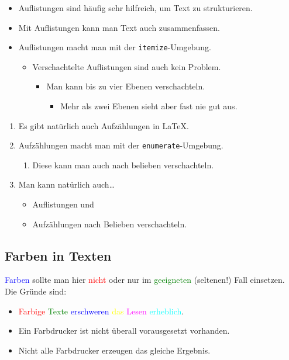 \documentclass{llncs}
\begin{document}
\begin{itemize}
\item Auflistungen sind häufig sehr hilfreich, um Text zu strukturieren. \item Mit Auflistungen kann man Text auch zusammenfassen.
\item Auflistungen macht man mit der \texttt{itemize}-Umgebung.
\begin{itemize}
\item Verschachtelte Auflistungen sind auch kein Problem.
\begin{itemize}
\item Man kann bis zu vier Ebenen verschachteln.
\begin{itemize}
\item Mehr als zwei Ebenen sieht aber fast nie gut aus.
\end{itemize}
\end{itemize}
\end{itemize}
\end{itemize}

\begin{enumerate}
\item Es gibt natürlich auch Aufzählungen in \LaTeX.
\item Aufzählungen macht man mit der \texttt{enumerate}-Umgebung.
\begin{enumerate}
\item Diese kann man auch nach belieben verschachteln.
\end{enumerate}
\item Man kann natürlich auch\dots
\begin{itemize}
\item Auflistungen und
\item Aufzählungen nach Belieben verschachteln.
\end{itemize}
\end{enumerate}

\subsection{Farben in Texten}

\textcolor{blue}{Farben} sollte man hier \textcolor{red}{nicht} oder nur im \textcolor{green}{geeigneten} (seltenen!) Fall einsetzen. Die Gründe sind:
\begin{itemize}
\item \textcolor{red}{Farbige} \textcolor{green}{Texte} \textcolor{blue}{erschweren} \textcolor{yellow}{das} \textcolor{magenta}{Lesen} \textcolor{cyan}{erheblich}.
\item Ein Farbdrucker ist nicht überall vorausgesetzt vorhanden.
\item Nicht alle Farbdrucker erzeugen das gleiche Ergebnis.
\end{itemize}
\end{document}
